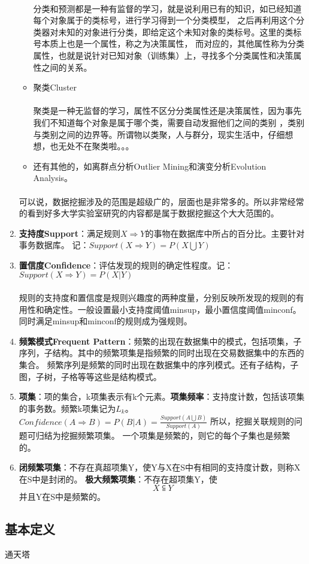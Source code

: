 \documentclass[a4paper,10pt,english]{article}
\begin{document}
\begin{enumerate}
\begin{itemize}
\paragraph{}
分类和预测都是一种有监督的学习，就是说利用已有的知识，如已经知道每个对象属于的类标号，进行学习得到一个分类模型，
之后再利用这个分类器对未知的对象进行分类，即给定这个未知对象的类标号。这里的类标号本质上也是一个属性，称之为决策属性，
而对应的，其他属性称为分类属性，也就是说针对已知对象（训练集）上，寻找多个分类属性和决策属性之间的关系。
\item
聚类Cluster
\paragraph{}
聚类是一种无监督的学习，属性不区分分类属性还是决策属性，因为事先我们不知道每个对象是属于哪个类，需要自动发掘他们之间的类别
，类别与类别之间的边界等。所谓物以类聚，人与群分，现实生活中，仔细想想，也无处不在聚类啦。。。
\item
还有其他的，如离群点分析Outlier Mining和演变分析Evolution Analysis。
\end{itemize}
\paragraph{}
可以说，数据挖掘涉及的范围是超级广的，层面也是非常多的。所以非常经常的看到好多大学实验室研究的内容都是属于数据挖掘这个大大范围的。

\item
\textbf{支持度Support}：满足规则$X \Rightarrow
Y$的事物在数据库中所占的百分比。主要针对事务数据库。 记：$Support(X
\Rightarrow Y)=P(X \bigcup Y)$
\item
\textbf{置信度Confidence}：评估发现的规则的确定性程度。记：$Support(X
\Rightarrow Y)=P(X|Y)$
\paragraph{}
规则的支持度和置信度是规则兴趣度的两种度量，分别反映所发现的规则的有用性和确定性。一般设置最小支持度阈值minsup，最小置信度阈值minconf。
同时满足minsup和minconf的规则成为强规则。

\item
\textbf{频繁模式Frequent
Pattern}：频繁的出现在数据集中的模式，包括项集，子序列，子结构。其中的频繁项集是指频繁的同时出现在交易数据集中的东西的集合。
频繁序列是频繁的同时出现在数据集中的序列模式。还有子结构，子图，子树，子格等等这些是结构模式。

\item
\textbf{项集}：项的集合，k项集表示有k个元素。\textbf{项集频率}：支持度计数，包括该项集的事务数。频繁k项集记为$L_{k}$。
$Confidence(A \Rightarrow B)=P(B|A)=\frac{Support(A \bigcup
B)}{Support(A)}$ 所以，挖掘关联规则的问题可归结为挖掘频繁项集。
一个项集是频繁的，则它的每个子集也是频繁的。

\item
\textbf{闭频繁项集}：不存在真超项集Y，使Y与X在S中有相同的支持度计数，则称X在S中是封闭的。
\textbf{极大频繁项集}：不存在超项集Y，使$$X \subseteqq Y $$
并且Y在S中是频繁的。
\end{enumerate}

\subsection{基本定义}
通天塔
\end{document}
